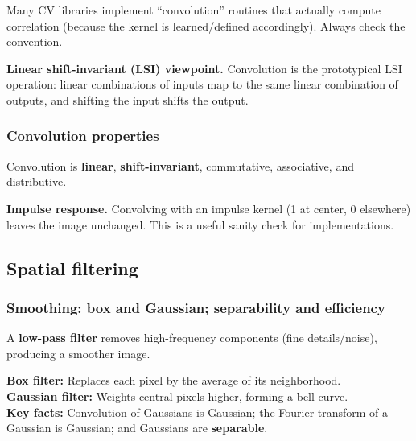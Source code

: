 \documentclass[11pt,a4paper]{article}
\begin{document}
\begin{notebox}
Many CV libraries implement ``convolution'' routines that actually compute correlation
(because the kernel is learned/defined accordingly). Always check the convention.
\end{notebox}

\begin{intbox}
\textbf{Linear shift-invariant (LSI) viewpoint.}
Convolution is the prototypical LSI operation: linear combinations of inputs map to the same
linear combination of outputs, and shifting the input shifts the output.
\end{intbox}


\subsubsection{Convolution properties}
\begin{notebox}
Convolution is \textbf{linear}, \textbf{shift-invariant}, commutative, associative, and distributive.
\end{notebox}

\begin{exbox}
\textbf{Impulse response.} Convolving with an impulse kernel (1 at center, 0 elsewhere) leaves the image unchanged.
This is a useful sanity check for implementations.
\end{exbox}


\subsection{Spatial filtering}

\subsubsection{Smoothing: box and Gaussian; separability and efficiency}

\begin{defbox}
A \textbf{low-pass filter} removes high-frequency components (fine details/noise), producing a smoother image.
\end{defbox}

\begin{defbox}
\textbf{Box filter:} Replaces each pixel by the average of its neighborhood.  \\
\textbf{Gaussian filter:} Weights central pixels higher, forming a bell curve.  \\
\textbf{Key facts:} Convolution of Gaussians is Gaussian; the Fourier transform of a Gaussian is Gaussian; and Gaussians are \textbf{separable}.
\end{defbox}
\end{document}

